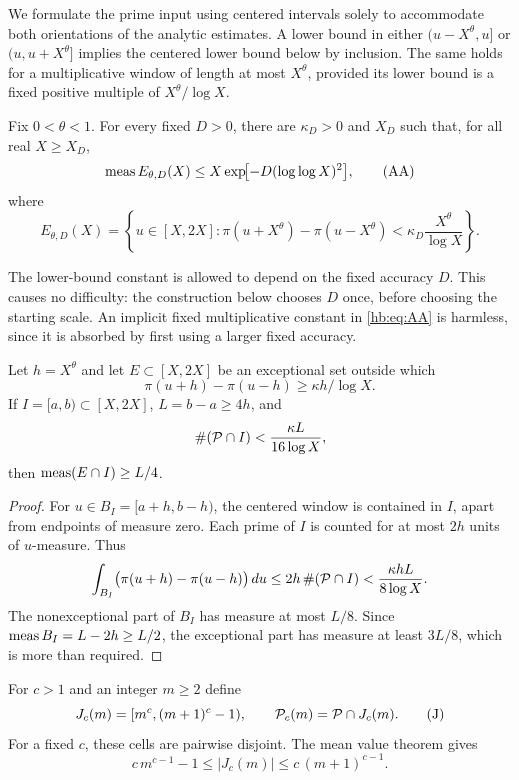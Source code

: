 We formulate the prime input using centered intervals solely to
accommodate both orientations of the analytic estimates.
A lower bound in either $(u-X^\theta,u]$ or
$(u,u+X^\theta]$ implies the centered lower bound below by inclusion.
The same holds for a multiplicative window of length at most
$X^\theta$, provided its lower bound is a fixed positive multiple
of $X^\theta/\log X$.

\begin{hypothesis}\label{hb:hyp:AA}
Fix $0<\theta<1$.  For every fixed $D>0$, there are
$\kappa_D>0$ and $X_D$ such that, for all real $X\ge X_D$,
\[
 \operatorname{meas} E_{\theta,D}(X)
       \le X\exp\!\bigl[-D(\log\log X)^2\bigr],
 \tag{AA}\label{hb:eq:AA}
\]
where
\[
 E_{\theta,D}(X)=
 \left\{u\in[X,2X]:
  \pi(u+X^\theta)-\pi(u-X^\theta)
       <\kappa_D\frac{X^\theta}{\log X}\right\}.
\]
\end{hypothesis}

The lower-bound constant is allowed to depend on the fixed accuracy
$D$.  This causes no difficulty: the construction below chooses
$D$ once, before choosing the starting scale.
An implicit fixed multiplicative constant in \eqref{hb:eq:AA} is
harmless, since it is absorbed by first using a larger fixed accuracy.

\begin{lemma}
\label{hb:lem:average}
Let $h=X^\theta$ and let $E\subset[X,2X]$ be an exceptional set
outside which
\[
 \pi(u+h)-\pi(u-h)\ge\kappa h/\log X.
\]
If $I=[a,b)\subset[X,2X]$, $L=b-a\ge4h$, and
\[
 \#(\mathcal P\cap I)<\frac{\kappa L}{16\log X},
\]
then $\operatorname{meas}(E\cap I)\ge L/4$.
\end{lemma}

\begin{proof}
For $u\in B_I=[a+h,b-h)$, the centered window is contained in $I$,
apart from endpoints of measure zero.  Each prime of $I$ is counted
for at most $2h$ units of $u$-measure.  Thus
\[
 \int_{B_I}\bigl(\pi(u+h)-\pi(u-h)\bigr)\,du
       \le2h\,\#(\mathcal P\cap I)
       <\frac{\kappa hL}{8\log X}.
\]
The nonexceptional part of $B_I$ has measure at most $L/8$.
Since $\operatorname{meas} B_I=L-2h\ge L/2$, the exceptional part has
measure at least $3L/8$, which is more than required.
\end{proof}

For $c>1$ and an integer $m\ge2$ define
\[
 J_c(m)=[m^c,(m+1)^c-1),\qquad
 \mathcal P_c(m)=\mathcal P\cap J_c(m).
 \tag{J}\label{hb:eq:J}
\]
For a fixed $c$, these cells are pairwise disjoint.  The mean value
theorem gives
\[
 c\,m^{c-1}-1\le |J_c(m)|
       \le c\,(m+1)^{c-1}.
 \tag{L}\label{hb:eq:length}
\]

